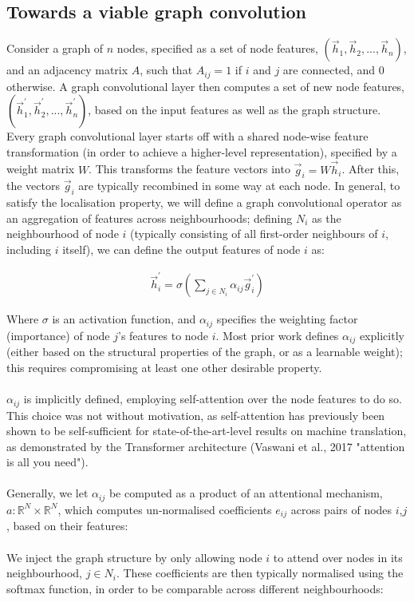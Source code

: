 \documentclass[12pt,a4paper]{article}
\begin{document}
\subsection*{Towards a viable graph convolution}
Consider a graph of $n$ nodes, specified as a set of node features, $( \overrightarrow{h}_{1},\overrightarrow{h}_{2},...,\overrightarrow{h}_{n})$, and an adjacency matrix $A$, such that $A_{ij}=1$ if $i$ and $j$ are connected, and $0$ otherwise. A graph convolutional layer then computes a set of new node features, $(\overrightarrow{h}_{1}^{'},\overrightarrow{h}_{2}^{'},...,\overrightarrow{h}_{n}^{'})$, based on the input features as well as the graph structure. Every graph convolutional layer starts off with a shared node-wise feature transformation (in order to achieve a higher-level representation), specified by a weight matrix $W$. This transforms the feature vectors into $\overrightarrow{g}_{i}=W\overrightarrow{h}_{i}$. After this, the vectors $\overrightarrow{g}_{i}$ are typically recombined in some way at each node. In general, to satisfy the localisation property, we will define a graph convolutional operator as an aggregation of features across neighbourhoods; defining $N_{i}$ as the neighbourhood of node $i$ (typically consisting of all first-order neighbours of $i$, including $i$ itself), we can define the output features of node $i$ as:

\begin{align*}
\overrightarrow{h}_{i}^{'} = \sigma \left(  \sum_{j \in N_{i}} \alpha_{ij}\overrightarrow{g}_{i}^{'}  \right)
\end{align*}

Where $\sigma$ is an activation function, and $\alpha_{ij}$ specifies the weighting factor (importance) of node $j$’s features to node $i$. Most prior work defines $\alpha_{ij}$ explicitly (either based on the structural properties of the graph, or as a learnable weight); this requires compromising at least one other desirable property.
\\ \\
$\alpha_{ij}$ is implicitly defined, employing self-attention over the node features to do so. This choice was not without motivation, as self-attention has previously been shown to be self-sufficient for state-of-the-art-level results on machine translation, as demonstrated by the Transformer architecture (Vaswani et al., 2017 "attention is all you need").
\\ \\
Generally, we let $\alpha_{ij}$ be computed as a product of an attentional mechanism, $a: \mathbb{R}^{N} \times \mathbb{R}^{N} $, which computes un-normalised coefficients $e_{ij}$ across pairs of nodes $i$,$j$, based on their features:
\\ \\
We inject the graph structure by only allowing node $i$ to attend over nodes in its neighbourhood, $j \in N_{i}$. These coefficients are then typically normalised using the softmax function, in order to be comparable across different neighbourhoods:
\end{document}
